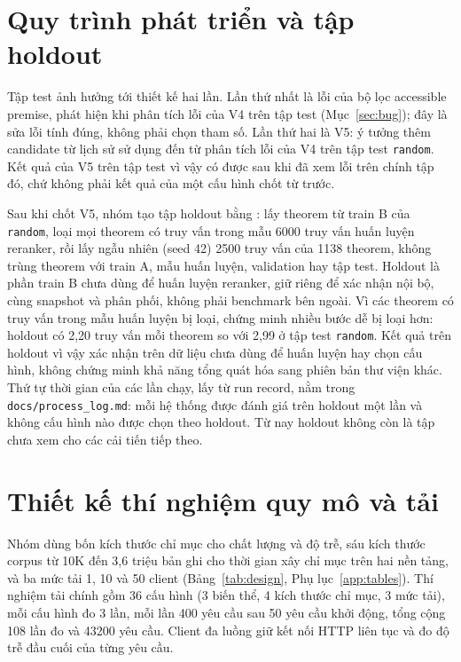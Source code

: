 \documentclass[11pt,a4paper,oneside]{report}
\newcommand{\code}[1]{\texttt{#1}}
\begin{document}
\section{Quy trình phát triển và tập holdout}\label{sec:holdout}

Tập test ảnh hưởng tới thiết kế hai lần. Lần thứ nhất là lỗi của bộ lọc accessible premise, phát hiện khi phân tích lỗi của
V4 trên tập test (Mục~\ref{sec:bug}); đây là sửa lỗi tính đúng, không phải chọn tham số. Lần thứ hai là V5: ý tưởng thêm
candidate từ lịch sử sử dụng đến từ phân tích lỗi của V4 trên tập test \code{random}. Kết quả của V5 trên tập test vì vậy
có được sau khi đã xem lỗi trên chính tập đó, chứ không phải kết quả của một cấu hình chốt từ trước.

Sau khi chốt V5, nhóm tạo tập holdout bằng : lấy theorem từ train B của
\code{random}, loại mọi theorem có truy vấn trong mẫu \num{6000} truy vấn huấn luyện reranker, rồi lấy ngẫu nhiên (seed 42)
\num{2500} truy vấn của \num{1138} theorem, không trùng theorem với train A, mẫu huấn luyện, validation hay tập test. Holdout
là phần train B chưa dùng để huấn luyện reranker, giữ riêng để xác nhận nội bộ, cùng snapshot và phân phối, không phải
benchmark bên ngoài. Vì các
theorem có truy vấn trong mẫu huấn luyện bị loại, chứng minh nhiều bước dễ bị loại hơn: holdout có 2,20 truy vấn mỗi theorem
so với 2,99 ở tập test \code{random}. Kết quả trên holdout vì vậy xác nhận trên dữ liệu chưa dùng để huấn luyện hay chọn
cấu hình, không chứng minh khả năng tổng quát hóa sang phiên bản thư viện khác. Thứ tự thời gian của các lần chạy, lấy từ
run record, nằm trong \code{docs/process\_log.md}: mỗi hệ thống được đánh giá trên holdout một lần và không cấu hình nào
được chọn theo holdout. Từ nay holdout không còn là tập chưa xem cho các cải tiến tiếp theo.

\section{Thiết kế thí nghiệm quy mô và tải}

Nhóm dùng bốn kích thước chỉ mục cho chất lượng và độ trễ, sáu kích thước corpus từ 10K đến 3,6 triệu bản ghi cho thời
gian xây chỉ mục trên hai nền tảng, và ba mức tải 1, 10 và 50 client (Bảng~\ref{tab:design}, Phụ lục~\ref{app:tables}). Thí
nghiệm tải chính gồm 36 cấu hình (3 biến thể, 4 kích thước chỉ mục, 3 mức tải), mỗi cấu hình đo 3 lần, mỗi lần 400 yêu cầu
sau 50 yêu cầu khởi động, tổng cộng 108 lần đo và \num{43200} yêu cầu. Client đa luồng giữ kết nối HTTP liên tục và đo độ
trễ đầu cuối của từng yêu cầu.
\end{document}
